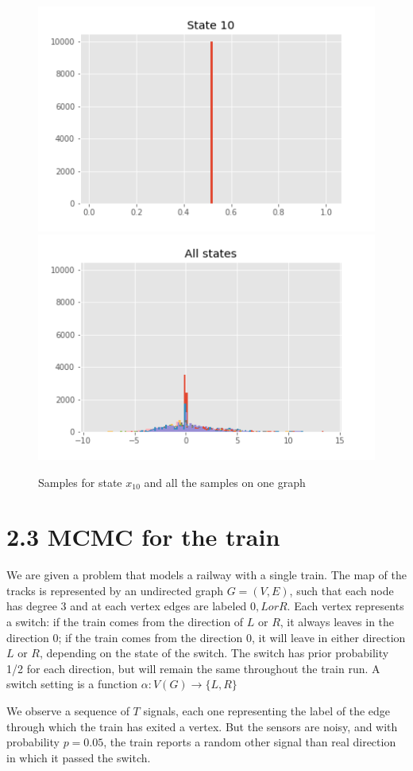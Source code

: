 \documentclass[]{article}
\begin{document}
	\begin{figure}[H]
		\begin{center}
			
			\includegraphics[width=.4\textwidth]{task2/figures/T_2_2/Q2/plt_x10.png}
			\includegraphics[width=.4\textwidth]{task2/figures/T_2_2/Q2/plt_x_all.png}
			
			\caption*{Samples for state $x_10$ and all the samples on one graph}
			
		\end{center}
	\end{figure}
	
	
	\newpage
	
	
	
	\section*{2.3 MCMC for the train}
	We are given a problem that models a railway with a single train. The map of the tracks is represented by an undirected graph $G=(V,E)$, such that each node has degree 3 and at each vertex edges are labeled $0, L or R$. Each vertex represents a switch: if the train comes from the direction of $L$ or $R$, it always leaves in the direction 0; if the train comes from the direction $0$, it will leave in either direction $L$ or $R$, depending on the state of the switch. The switch has prior probability 1/2 for each direction, but will remain the same throughout the train run. A switch setting is a function $\alpha : V(G) \rightarrow \{L,R\}$
	
	We observe a sequence of $T$ signals, each one representing the label of the edge through which the train has exited a vertex. But the sensors are noisy, and with probability $p = 0.05$, the train reports a random other signal than real direction in which it passed the switch. 
	
\end{document}
